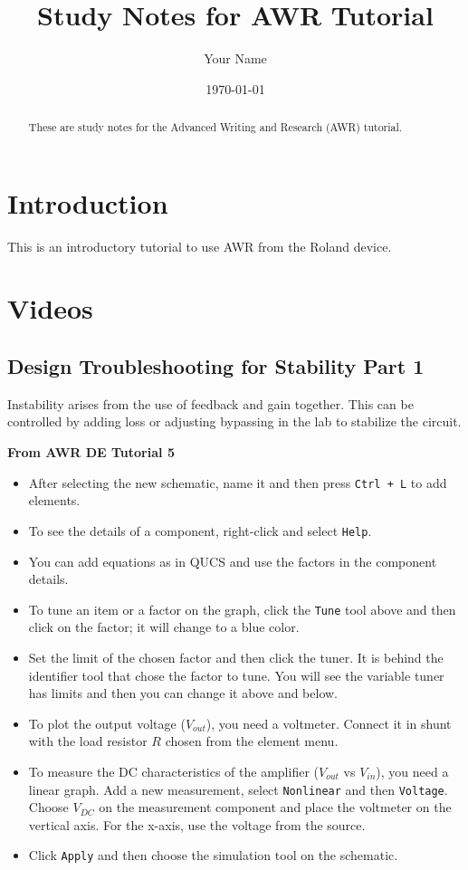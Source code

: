 \documentclass{article}
\title{Study Notes for AWR Tutorial}
\author{Your Name}
\date{\today}
\begin{document}
\maketitle

\begin{abstract}
These are study notes for the Advanced Writing and Research (AWR) tutorial.
\end{abstract}

\tableofcontents

\section{Introduction}
This is an introductory tutorial to use AWR from the Roland device.

\section{Videos}

\subsection{Design Troubleshooting for Stability Part 1}
Instability arises from the use of feedback and gain together. This can be controlled by adding loss or adjusting bypassing in the lab to stabilize the circuit.

\textbf{From AWR DE Tutorial 5}
\begin{itemize}
    \item After selecting the new schematic, name it and then press \texttt{Ctrl + L} to add elements.
    \item To see the details of a component, right-click and select \texttt{Help}.\cite{paper_2}
    \item You can add equations as in QUCS and use the factors in the component details.
    \item To tune an item or a factor on the graph, click the \texttt{Tune} tool above and then click on the factor; it will change to a blue color.
    \item Set the limit of the chosen factor and then click the tuner. It is behind the identifier tool that chose the factor to tune. You will see the variable tuner has limits and then you can change it above and below.
    \item To plot the output voltage (\( V_{out} \)), you need a voltmeter. Connect it in shunt with the load resistor \( R \) chosen from the element menu.
    \item To measure the DC characteristics of the amplifier (\( V_{out} \) vs \( V_{in} \)), you need a linear graph. Add a new measurement, select \texttt{Nonlinear} and then \texttt{Voltage}. Choose \( V_{DC} \) on the measurement component and place the voltmeter on the vertical axis. For the x-axis, use the voltage from the source.
    \item Click \texttt{Apply} and then choose the simulation tool on the schematic.
\end{itemize}
\end{document}
